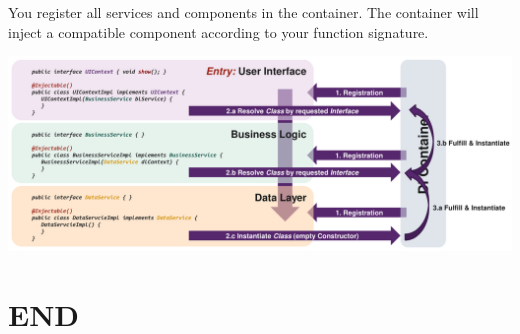 \documentclass[11pt,twoside,landscape]{article}
\begin{document}
\begin{multicols}{3}
You register all services and components in the container.
The container will inject a compatible component according to your function signature.


{
\begin{center}
\includegraphics[width=.9\linewidth]{img/dependency_injection_example.png}
\end{center}
\label{fig:dependency-injection-example}
}
\section{END}
\label{sec:org5ef54c8}
\end{multicols}
\end{document}
